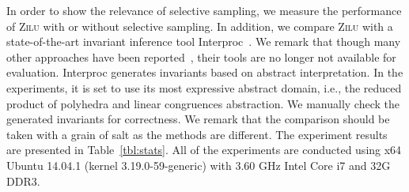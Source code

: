 In order to show the relevance of selective sampling, we measure the performance of \textsc{Zilu} with or without selective sampling. In addition, we compare \textsc{Zilu} with a state-of-the-art invariant inference tool Interproc~\cite{jeannet2010interproc}. We remark that though many other approaches have been reported~\cite{sharma2012interpolants,sharma2013verification,DBLP:conf/esop/0001GHALN13,sharma2014invariant}, their tools are no longer not available for evaluation.
Interproc generates invariants based on abstract interpretation. In the experiments, it is set to use its most expressive abstract domain, i.e., the reduced product of polyhedra and linear congruences abstraction. %
We manually check the generated invariants for correctness. %
We remark that the comparison should be taken with a grain of salt as the methods are different. The experiment results are presented in Table~\ref{tbl:stats}. All of the experiments are conducted using x64 Ubuntu 14.04.1 (kernel 3.19.0-59-generic) with 3.60 GHz Intel Core i7 and 32G DDR3.

